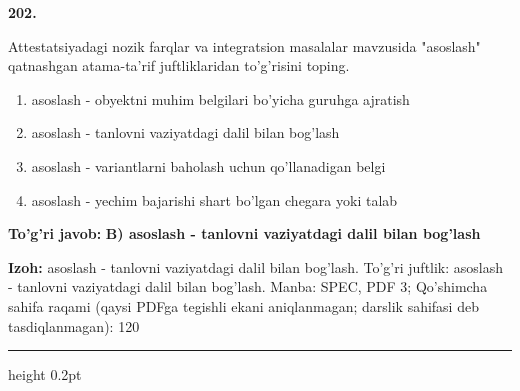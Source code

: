 \documentclass[10pt,a4paper]{article}
\begin{document}
{\bfseries\sffamily\color{ink} 202.}
\par
Attestatsiyadagi nozik farqlar va integratsion masalalar mavzusida "asoslash" qatnashgan atama-ta'rif juftliklaridan to'g'risini toping.
\begin{enumerate}[label=\Alph*),leftmargin=9mm]
\item asoslash - obyektni muhim belgilari bo'yicha guruhga ajratish
\item asoslash - tanlovni vaziyatdagi dalil bilan bog'lash
\item asoslash - variantlarni baholash uchun qo'llanadigan belgi
\item asoslash - yechim bajarishi shart bo'lgan chegara yoki talab
\end{enumerate}
\begin{tcolorbox}[enhanced,breakable,colback=teal!4,colframe=teal!60!black,boxrule=0.45pt,arc=1.2mm,left=2.7mm,right=2.7mm,top=1.8mm,bottom=1.8mm,before skip=2mm,after skip=2mm]
{\bfseries\sffamily\color{teal}To'g'ri javob:} \textbf{B) asoslash - tanlovni vaziyatdagi dalil bilan bog'lash}
\par\smallskip
{\bfseries Izoh:} asoslash - tanlovni vaziyatdagi dalil bilan bog'lash. To'g'ri juftlik: asoslash - tanlovni vaziyatdagi dalil bilan bog'lash. Manba: SPEC, PDF 3; Qo'shimcha sahifa raqami (qaysi PDFga tegishli ekani aniqlanmagan; darslik sahifasi deb tasdiqlanmagan): 120
\end{tcolorbox}
\vspace{2mm}\hrule height 0.2pt\vspace{3mm}
\end{document}
